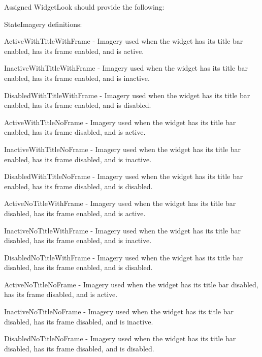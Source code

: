 Assigned Widget\+Look should provide the following\+: 
\begin{DoxyItemize}
\item State\+Imagery definitions\+: 
\begin{DoxyItemize}
\item Active\+With\+Title\+With\+Frame -\/ Imagery used when the widget has its title bar enabled, has its frame enabled, and is active. 
\item Inactive\+With\+Title\+With\+Frame -\/ Imagery used when the widget has its title bar enabled, has its frame enabled, and is inactive. 
\item Disabled\+With\+Title\+With\+Frame -\/ Imagery used when the widget has its title bar enabled, has its frame enabled, and is disabled. 
\item Active\+With\+Title\+No\+Frame -\/ Imagery used when the widget has its title bar enabled, has its frame disabled, and is active. 
\item Inactive\+With\+Title\+No\+Frame -\/ Imagery used when the widget has its title bar enabled, has its frame disabled, and is inactive. 
\item Disabled\+With\+Title\+No\+Frame -\/ Imagery used when the widget has its title bar enabled, has its frame disabled, and is disabled. 
\item Active\+No\+Title\+With\+Frame -\/ Imagery used when the widget has its title bar disabled, has its frame enabled, and is active. 
\item Inactive\+No\+Title\+With\+Frame -\/ Imagery used when the widget has its title bar disabled, has its frame enabled, and is inactive. 
\item Disabled\+No\+Title\+With\+Frame -\/ Imagery used when the widget has its title bar disabled, has its frame enabled, and is disabled. 
\item Active\+No\+Title\+No\+Frame -\/ Imagery used when the widget has its title bar disabled, has its frame disabled, and is active. 
\item Inactive\+No\+Title\+No\+Frame -\/ Imagery used when the widget has its title bar disabled, has its frame disabled, and is inactive. 
\item Disabled\+No\+Title\+No\+Frame -\/ Imagery used when the widget has its title bar disabled, has its frame disabled, and is disabled. 
\end{DoxyItemize}



\end{DoxyItemize}
